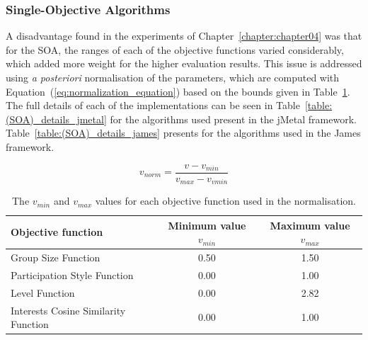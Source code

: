 \subsubsection{Single-Objective Algorithms}
\label{sub:soa_implementation}

A disadvantage found in the experiments of Chapter~\ref{chapter:chapter04} was that for the SOA, the ranges of each of the objective functions varied considerably, which added more weight for the higher evaluation results. This issue is addressed using {\em a posteriori} normalisation of the parameters, which are computed with Equation~(\ref{eq:normalization_equation}) based on the bounds given in Table~\ref{table:normalization_parameters}. \\

The full details of each of the implementations can be seen in Table~\ref{table:(SOA)_details_jmetal} for the algorithms used present in the jMetal framework.  Table~\ref{table:(SOA)_details_james} presents for the algorithms used in the James framework.

\begin{equation}
    v_{norm} = \frac{v- v_{min}}{v_{max} - v_{vmin}} 
    \label{eq:normalization_equation}
\end{equation}

\begin{table}[H]
    \begin{tabular}{lcc}
    \hline
    Objective function & Minimum value $v_{min}$ & Maximum value $v_{max}$ \\
    \hline
    Group Size Function                  & 0.50  & 1.50 \\
    Participation Style Function         & 0.00  & 1.00 \\
    Level Function                       & 0.00  & 2.82 \\
    Interests Cosine Similarity Function & 0.00  & 1.00 \\
    \hline
    \end{tabular}
    \caption{The $v_{min}$ and $v_{max}$ values for each objective function used in the normalisation.}
    \label{table:normalization_parameters}
\end{table}


